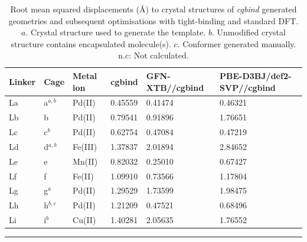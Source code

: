 \documentclass[../../main.tex]{subfiles}
\newcommand{\cgbind}{\emph{cgbind }}
\begin{document}
\begin{table}[h!]
	\def\arraystretch{1.5}
	\begin{tabularx}{\textwidth}{YYYYYY}
		\hline
		Linker&	Cage&	Metal ion&	cgbind&	GFN-XTB//cgbind&PBE-D3BJ/def2-SVP//cgbind\\
		\hline
		La	&a$^{a,b}$&	Pd(II)&	0.45559	&0.41474	&0.46321
\\
		Lb	&b			&	Pd(II)&	0.79541	&0.91896	&1.76651
\\
		Lc	&c$^{b}$&	Pd(II)&	0.62754	&0.47084&	0.47219
\\
		Ld	&d$^{a,b}$&	Fe(III)	&1.37837&	2.01894	&2.84652
\\
		Le&	e		&			Mn(II)&	0.82032	&0.25010&	0.67427
\\
		Lf&	f				&	Fe(II)	&1.09910&	0.73566	&1.17804
\\
		Lg	&g$^{a}$	&	Pd(II)&	1.29529	&1.73599&	1.98475
\\
		Lh	&h$^{b,c}$	&	Pd(II)&	1.21209	&0.47521&	0.68496
\\
		Li&	i$^{b}$			&Cu(II)&	1.40281	&2.05635	&1.76552
\\
		
	\end{tabularx}
	\hrule
	\caption{Root mean squared displacements (\AA) to crystal structures of \cgbind generated geometries and subsequent optimisations with tight-binding and standard DFT. $a.$ Crystal structure used to generate the template. $b.$ Unmodified crystal structure contains encapsulated molecule(s). $c.$ Conformer generated manually. n.c: Not calculated.}
	\label{table::si_cg_1}
\end{table}
\end{document}
